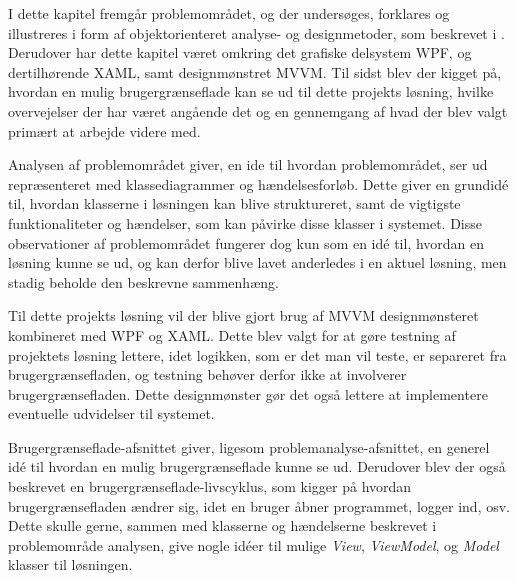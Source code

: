 I dette kapitel fremgår problemområdet, og der undersøges, forklares og illustreres i form af objektorienteret analyse- og designmetoder, som beskrevet i \cite{ObjektAnalyseDesign}. Derudover har dette kapitel været omkring det grafiske delsystem WPF, og dertilhørende XAML, samt designmønstret MVVM. Til sidst blev der kigget på, hvordan en mulig brugergrænseflade kan se ud til dette projekts løsning, hvilke overvejelser der har været angående det og en gennemgang af hvad der blev valgt primært at arbejde videre med.

Analysen af problemområdet giver, en ide til hvordan problemområdet, ser ud repræsenteret med klassediagrammer og hændelsesforløb. Dette giver en grundidé til, hvordan klasserne i løsningen kan blive struktureret, samt de vigtigste funktionaliteter og hændelser, som kan påvirke disse klasser i systemet. Disse observationer af problemområdet fungerer dog kun som en idé til, hvordan en løsning kunne se ud, og kan derfor blive lavet anderledes i en aktuel løsning, men stadig beholde den beskrevne sammenhæng.

Til dette projekts løsning vil der blive gjort brug af MVVM designmønsteret kombineret med WPF og XAML. Dette blev valgt for at gøre testning af projektets løsning lettere, idet logikken, som er det man vil teste, er separeret fra brugergrænsefladen, og testning behøver derfor ikke at involverer brugergrænsefladen. Dette designmønster gør det også lettere at implementere eventuelle udvidelser til systemet.

Brugergrænseflade-afsnittet giver, ligesom problemanalyse-afsnittet, en generel idé til hvordan en mulig brugergrænseflade kunne se ud. Derudover blev der også beskrevet en brugergrænseflade-livscyklus, som kigger på hvordan brugergrænsefladen ændrer sig, idet en bruger åbner programmet, logger ind, osv. Dette skulle gerne, sammen med klasserne og hændelserne beskrevet i problemområde analysen, give nogle idéer til mulige \textit{View}, \textit{ViewModel}, og \textit{Model} klasser til løsningen.